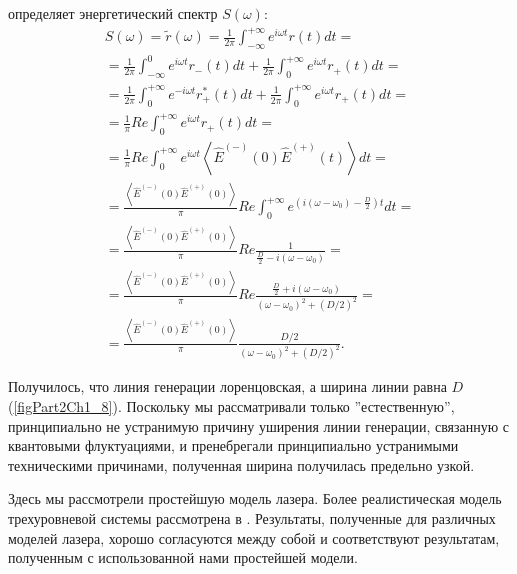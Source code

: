 определяет энергетический спектр $S\left(\omega\right)$:
\begin{eqnarray}
S\left(\omega\right) = \tilde{r}\left(\omega\right) = 
\frac{1}{2\pi}
\int_{-\infty}^{+\infty}e^{i \omega t} r\left(t\right) dt =
\nonumber \\
=
\frac{1}{2\pi}
\int_{-\infty}^0e^{i \omega t} r_{-}\left(t\right) dt +
\frac{1}{2\pi}
\int_0^{+\infty}e^{i \omega t} r_{+}\left(t\right) dt = 
\nonumber \\
=
\frac{1}{2\pi}
\int_0^{+\infty}e^{- i \omega t} r_{+}^{*}\left(t\right) dt +
\frac{1}{2\pi}
\int_0^{+\infty}e^{i \omega t} r_{+}\left(t\right) dt = 
\nonumber \\
=
\frac{1}{\pi} Re
\int_0^{+\infty}e^{i \omega t} r_{+}\left(t\right) dt = 
\nonumber \\
= \frac{1}{\pi}Re
\int_0^{+\infty}e^{i \omega t}
\left<\hat{E}^{(-)}\left(0\right)\hat{E}^{(+)}\left(t\right)\right> dt
=
\nonumber \\
= \frac{\left<\hat{E}^{(-)}\left(0\right)\hat{E}^{(+)}\left(0\right)\right>}{\pi}Re
\int_0^{+\infty}e^{\left(i \left(\omega - \omega_0\right) - \frac{D}{2} \right) t} dt
=
\nonumber \\
=
\frac{\left<\hat{E}^{(-)}\left(0\right)\hat{E}^{(+)}\left(0\right)\right>}{\pi}Re
\frac{1}{\frac{D}{2} - i \left(\omega - \omega_0\right)}
=
\nonumber \\
=
\frac{\left<\hat{E}^{(-)}\left(0\right)\hat{E}^{(+)}\left(0\right)\right>}{\pi}Re
\frac{\frac{D}{2} + i \left(\omega - \omega_0\right)}
{\left(\omega - \omega_0\right)^2 + \left(D/2\right)^2}
=
\nonumber \\
=
\frac{\left<\hat{E}^{(-)}\left(0\right)\hat{E}^{(+)}\left(0\right)\right>}{\pi}
\frac{D/2}{\left(\omega - \omega_0\right)^2 + \left(D/2\right)^2}. 
\label{eqCh3_22}
\end{eqnarray}




Получилось, что линия генерации лоренцовская, а ширина линии равна $D$ 
(\autoref{figPart2Ch1_8}). Поскольку мы рассматривали только ''естественную'',
принципиально не устранимую причину уширения линии генерации,
связанную с квантовыми флуктуациями, и пренебрегали принципиально
устранимыми техническими причинами, полученная ширина получилась
предельно узкой.  

Здесь мы рассмотрели простейшую модель лазера. Более
реалистическая модель трехуровневой системы рассмотрена в
\cite{bHaken1988}. Результаты, полученные для различных моделей
лазера, хорошо согласуются между собой и соответствуют результатам, 
полученным с использованной нами простейшей модели. 

